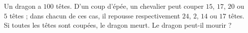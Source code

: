 Un dragon a $100$ têtes. D'un coup d'épée, un chevalier peut couper $15$, $17$, $20$ ou $5$ têtes ; dans chacun de ces cas, il repousse respectivement $24$, $2$, $14$ ou $17$ têtes. Si toutes les têtes sont coupées, le dragon meurt. Le dragon peut-il mourir ?
